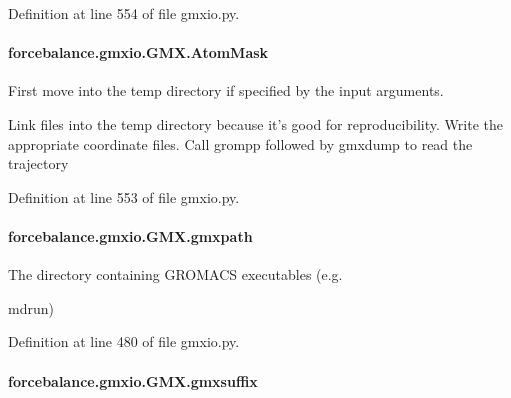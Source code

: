 Definition at line 554 of file gmxio.\-py.

\hypertarget{classforcebalance_1_1gmxio_1_1GMX_a9503a409fe32d337e8b6f89806185ba3}{
\paragraph[{Atom\-Mask}]{\setlength{\rightskip}{0pt plus 5cm}forcebalance.\-gmxio.\-G\-M\-X.\-Atom\-Mask}}\label{classforcebalance_1_1gmxio_1_1GMX_a9503a409fe32d337e8b6f89806185ba3}


First move into the temp directory if specified by the input arguments. 

Link files into the temp directory because it's good for reproducibility. Write the appropriate coordinate files. Call grompp followed by gmxdump to read the trajectory 

Definition at line 553 of file gmxio.\-py.

\hypertarget{classforcebalance_1_1gmxio_1_1GMX_ab2081cd93ac2c3a80e205884e0f12710}{
\paragraph[{gmxpath}]{\setlength{\rightskip}{0pt plus 5cm}forcebalance.\-gmxio.\-G\-M\-X.\-gmxpath}}\label{classforcebalance_1_1gmxio_1_1GMX_ab2081cd93ac2c3a80e205884e0f12710}


The directory containing G\-R\-O\-M\-A\-C\-S executables (e.\-g. 

mdrun) 

Definition at line 480 of file gmxio.\-py.

\hypertarget{classforcebalance_1_1gmxio_1_1GMX_ad3255c98ff1cdd0f3ae115857d899ce5}{
\paragraph[{gmxsuffix}]{\setlength{\rightskip}{0pt plus 5cm}forcebalance.\-gmxio.\-G\-M\-X.\-gmxsuffix}}\label{classforcebalance_1_1gmxio_1_1GMX_ad3255c98ff1cdd0f3ae115857d899ce5}


